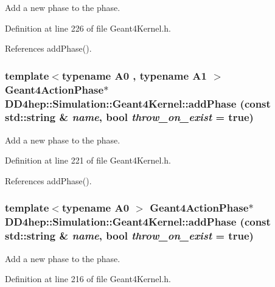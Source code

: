 Add a new phase to the phase. 

Definition at line 226 of file Geant4Kernel.h.

References addPhase().\hypertarget{class_d_d4hep_1_1_simulation_1_1_geant4_kernel_a3f0e8487909e620f5d7a74153c4aa418}{
\subsubsection[{addPhase}]{\setlength{\rightskip}{0pt plus 5cm}template$<$typename A0 , typename A1 $>$ {\bf Geant4ActionPhase}$\ast$ DD4hep::Simulation::Geant4Kernel::addPhase (const std::string \& {\em name}, \/  bool {\em throw\_\-on\_\-exist} = {\ttfamily true})}}
\label{class_d_d4hep_1_1_simulation_1_1_geant4_kernel_a3f0e8487909e620f5d7a74153c4aa418}


Add a new phase to the phase. 

Definition at line 221 of file Geant4Kernel.h.

References addPhase().\hypertarget{class_d_d4hep_1_1_simulation_1_1_geant4_kernel_a3f0e8487909e620f5d7a74153c4aa418}{
\subsubsection[{addPhase}]{\setlength{\rightskip}{0pt plus 5cm}template$<$typename A0 $>$ {\bf Geant4ActionPhase}$\ast$ DD4hep::Simulation::Geant4Kernel::addPhase (const std::string \& {\em name}, \/  bool {\em throw\_\-on\_\-exist} = {\ttfamily true})}}
\label{class_d_d4hep_1_1_simulation_1_1_geant4_kernel_a3f0e8487909e620f5d7a74153c4aa418}


Add a new phase to the phase. 

Definition at line 216 of file Geant4Kernel.h.

